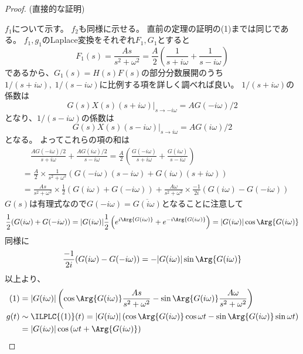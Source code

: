 			\begin{proof}
				(直接的な証明)
				\quad\par
				$f_1$について示す。
				$f_2$も同様に示せる。
				直前の定理の証明の(1)までは同じである。
				$f_1,g_1$のLaplace変換をそれぞれ$F_1,G_1$とすると
				\[ F_1(s) = \frac{As}{s^2+\omega^2} = \frac{A}{2}\left(\frac{1}{s+i\omega} + \frac{1}{s-i\omega}\right) \]
				であるから、$G_1(s) = H(s)F(s)$の部分分数展開のうち$1/(s+i\omega),\;1/(s-i\omega)$に比例する項を詳しく調べれば良い。
				$1/(s+i\omega)$の係数は
				\[ \left. G(s)X(s)(s+i\omega) \right|_{s\to-i\omega} = AG(-i\omega)/2\]
				となり、$1/(s-i\omega)$の係数は
				\[ \left. G(s)X(s)(s-i\omega) \right|_{s\to i\omega} = AG(i\omega)/2\]
				となる。
				よってこれらの項の和は
				\begin{align}
					&\quad \frac{AG(-i\omega)/2}{s+i\omega} + \frac{AG(i\omega)/2}{s-i\omega} = \frac{A}{2}\left(\frac{G(-i\omega)}{s+i\omega} + \frac{G(i\omega)}{s-i\omega}\right) \nonumber\\
					&= \frac{A}{2}\times\frac{1}{s^2+\omega^2}\left(G(-i\omega)(s-i\omega) + G(i\omega)(s+i\omega)\right) \nonumber\\
					&= \frac{As}{s^2+\omega^2}\times\frac{1}{2}(G(i\omega)+G(-i\omega)) + \frac{A\omega}{s^2+\omega^2}\times\frac{-1}{2i}(G(i\omega)-G(-i\omega))
				\end{align}
				$G(s)$は有理式なので$G(-i\omega) = \overline{G(i\omega)}$となることに注意して
				\[ \frac{1}{2}(G(i\omega)+G(-i\omega)) = |G(i\omega)|\frac{1}{2}\left(e^{i\Arg{G(i\omega)}} + e^{-i\Arg{G(i\omega)}}\right) = |G(i\omega)|\cos\Arg{G(i\omega)} \]
				同様に
				\[ \frac{-1}{2i}(G(i\omega)-G(-i\omega)) = -|G(i\omega)|\sin\Arg{G(i\omega)} \]
				以上より、
				\begin{align*}
					(1) &= |G(i\omega)|\left(\cos\Arg{G(i\omega)}\frac{As}{s^2+\omega^2} - \sin\Arg{G(i\omega)}\frac{A\omega}{s^2+\omega^2} \right) \\
					g(t) &\sim \ILPLC{(1)}(t) = |G(i\omega)|\left(\cos\Arg{G(i\omega)}\cos\omega t - \sin\Arg{G(i\omega)}\sin\omega t \right) \\
					&= |G(i\omega)|\cos\left(\omega t + \Arg{G(i\omega)}\right)
				\end{align*}
			\end{proof}